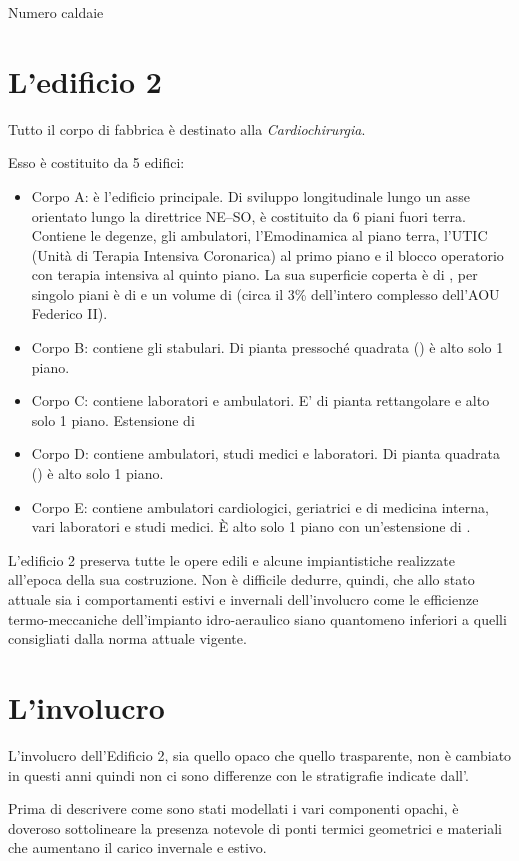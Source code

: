 Numero caldaie
\clearpage
\section{L'edificio 2}
Tutto il corpo di fabbrica è destinato alla \emph{Cardiochirurgia}.

Esso è costituito da 5 edifici:
\begin{itemize}
	\item Corpo A: è l'edificio principale. Di sviluppo longitudinale lungo un asse orientato lungo la direttrice NE--SO, è costituito da 6 piani fuori terra. Contiene le degenze, gli ambulatori, l'Emodinamica al piano terra, l'UTIC (Unità di Terapia Intensiva Coronarica) al primo piano e il blocco operatorio con terapia intensiva al quinto piano. La sua superficie coperta è di , per singolo piani è di  e un volume di  (circa il 3\% dell'intero complesso dell'AOU Federico II).
	\item Corpo B: contiene gli stabulari. Di pianta pressoché quadrata () è alto solo 1 piano. 
	\item Corpo C: contiene laboratori e ambulatori. E' di pianta rettangolare e alto solo 1 piano. Estensione di 
	\item Corpo D: contiene ambulatori, studi medici e laboratori. Di pianta quadrata () è alto solo 1 piano. 
	\item Corpo E: contiene ambulatori cardiologici, geriatrici e di medicina interna, vari laboratori e studi medici. È alto solo 1 piano con un'estensione di .
\end{itemize}

L'edificio 2 preserva tutte le opere edili e alcune impiantistiche realizzate all'epoca della sua costruzione. Non è difficile dedurre, quindi, che allo stato attuale sia i comportamenti estivi e invernali dell'involucro come le efficienze termo-meccaniche dell'impianto idro-aeraulico siano quantomeno inferiori a quelli consigliati dalla norma attuale vigente. 

\section{L'involucro}
L'involucro dell'Edificio 2, sia quello opaco che quello trasparente, non è cambiato in questi anni quindi non ci sono differenze con le stratigrafie indicate dall'.

Prima di descrivere come sono stati modellati i vari componenti opachi, è doveroso sottolineare la presenza notevole di ponti termici geometrici e materiali che aumentano il carico invernale e estivo.

